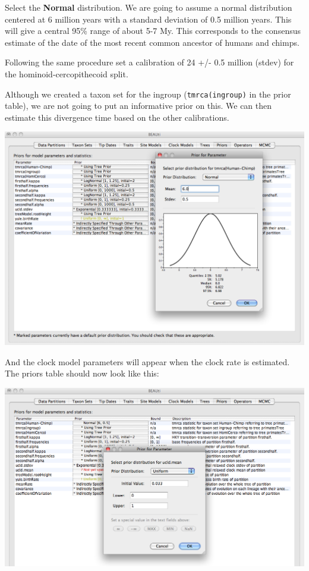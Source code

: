 \documentclass[12pt]{article}
\begin{document}
Select the \textbf{Normal} distribution.
We are going to assume a normal distribution centered at 6 million
years with a standard deviation of 0.5 million years. This will give
a central 95\% range of about 5-7 My. This corresponds to the consensus
estimate of the date of the most recent common ancestor of humans and chimps.

Following the same procedure set a calibration of 24 +/- 0.5 million (stdev) for the hominoid-cercopithecoid split.

Although we created a taxon set for the ingroup (\texttt{tmrca(ingroup)}
in the prior table), we are not going to put an informative prior
on this. We can then estimate this divergence time based on the other calibrations. 

\medskip{}

\includegraphics[scale=0.4]{figures/BEAUti_Prior1}

\medskip{}

And the clock model parameters will appear when the clock rate is estimated. The priors table should now look like this: 

\medskip{}

\includegraphics[scale=0.4]{figures/BEAUti_Prior2}
\end{document}

